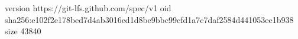 version https://git-lfs.github.com/spec/v1
oid sha256:e102f2e178bed7d4ab3016ed1d8be9bbc99cfd1a7c7daf2584d441053ee1b938
size 43840
